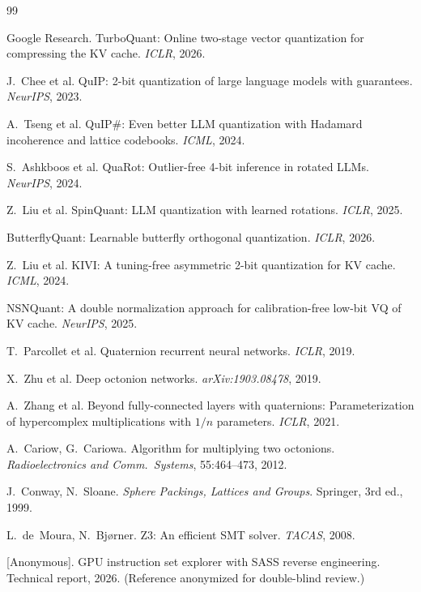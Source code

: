 \documentclass[sigconf,anonymous,review]{acmart}
\begin{document}

\begin{thebibliography}{99}

Google Research. TurboQuant: Online two-stage vector quantization for
compressing the KV cache. \emph{ICLR}, 2026.

J.~Chee et al. QuIP: 2-bit quantization of large language models
with guarantees. \emph{NeurIPS}, 2023.

A.~Tseng et al. QuIP\#: Even better LLM quantization with Hadamard
incoherence and lattice codebooks. \emph{ICML}, 2024.

S.~Ashkboos et al. QuaRot: Outlier-free 4-bit inference in rotated LLMs.
\emph{NeurIPS}, 2024.

Z.~Liu et al. SpinQuant: LLM quantization with learned rotations.
\emph{ICLR}, 2025.

ButterflyQuant: Learnable butterfly orthogonal quantization.
\emph{ICLR}, 2026.

Z.~Liu et al. KIVI: A tuning-free asymmetric 2-bit quantization
for KV cache. \emph{ICML}, 2024.

NSNQuant: A double normalization approach for calibration-free low-bit
VQ of KV cache. \emph{NeurIPS}, 2025.

T.~Parcollet et al. Quaternion recurrent neural networks.
\emph{ICLR}, 2019.

X.~Zhu et al. Deep octonion networks. \emph{arXiv:1903.08478}, 2019.

A.~Zhang et al. Beyond fully-connected layers with quaternions:
Parameterization of hypercomplex multiplications with $1/n$ parameters.
\emph{ICLR}, 2021.

A.~Cariow, G.~Cariowa. Algorithm for multiplying two octonions.
\emph{Radioelectronics and Comm.\ Systems}, 55:464--473, 2012.

J.~Conway, N.~Sloane. \emph{Sphere Packings, Lattices and Groups}.
Springer, 3rd ed., 1999.

L.~de~Moura, N.~Bj{\o}rner. Z3: An efficient SMT solver.
\emph{TACAS}, 2008.

[Anonymous]. GPU instruction set explorer with SASS reverse engineering.
Technical report, 2026. (Reference anonymized for double-blind review.)

\end{thebibliography}
\end{document}
